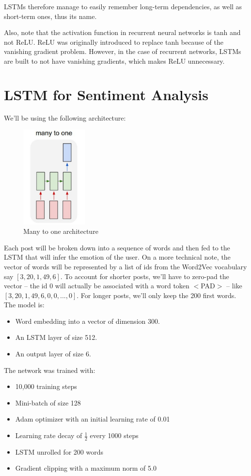 LSTMs therefore manage to easily remember long-term dependencies, as well as short-term ones, thus its name.

Also, note that the activation function in recurrent neural networks is tanh and not ReLU. ReLU was originally introduced to replace tanh because of the vanishing gradient problem. However, in the case of recurrent networks, LSTMs are built to not have vanishing gradients, which makes ReLU unnecessary.

\newpage
\section{LSTM for Sentiment Analysis}
We'll be using the following architecture:

\begin{figure}[H]
    \centering
    \includegraphics[width=0.3\textwidth]{Images/many-to-one.png}
    \caption{Many to one architecture}
\end{figure}

Each post will be broken down into a sequence of words and then fed to the LSTM that will infer the emotion of the user. On a more technical note, the vector of words will be represented by a list of ids from the Word2Vec vocabulary say $[3, 20, 1, 49, 6]$. To account for shorter posts, we'll have to zero-pad the vector -- the id 0 will actually be associated with a word token $<$PAD$>$ -- like $[3, 20, 1, 49, 6, 0, 0, ..., 0]$. For longer posts, we'll only keep the 200 first words. The model is:
\begin{itemize}
    \item Word embedding into a vector of dimension 300.
    \item An LSTM layer of size 512.
    \item An output layer of size 6.
\end{itemize}

The network was trained with:
\begin{itemize}[topsep=0pt]
    \itemsep-1em
    \item 10,000 training steps
    \item Mini-batch of size 128
    \item Adam optimizer with an initial learning rate of 0.01
    \item Learning rate decay of $\frac{1}{2}$ every 1000 steps
    \item LSTM unrolled for 200 words
    \item Gradient clipping with a maximum norm of 5.0
\end{itemize}

